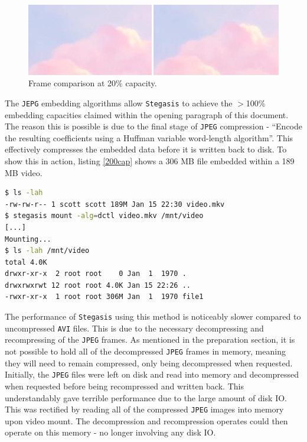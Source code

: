 \documentclass[paper=a4, fontsize=11pt,twoside]{scrartcl}
\numberwithin{table}{section}
\numberwithin{figure}{section}
\numberwithin{algorithm}{section}
\begin{document}
\begin{figure}[!h]
\centerline{\includegraphics[width=\textwidth]{images/bb_20cap.png}}
\caption{Frame comparison at 20\% capacity.}
\label{jpegnoart}
\end{figure}

\noindent
The \texttt{JEPG} embedding algorithms allow \texttt{Stegasis} to achieve the $>$100\% embedding capacities claimed within the opening paragraph of this document. The reason this is possible is due to the final stage of \texttt{JPEG} compression - ``Encode the resulting coefficients using a Huffman variable word-length algorithm''. This effectively compresses the embedded data before it is written back to disk. To show this in action, listing \ref{200cap} shows a 306 MB file embedded within a 189 MB video.

\begin{lstlisting}[language=bash,caption={Demonstration of 162\% embedding capacity.}, frame=single, label=200cap]
$ ls -lah
-rw-rw-r-- 1 scott scott 189M Jan 15 22:30 video.mkv
$ stegasis mount -alg=dctl video.mkv /mnt/video
[...]
Mounting...
$ ls -lah /mnt/video
total 4.0K
drwxr-xr-x  2 root root    0 Jan  1  1970 .
drwxrwxrwt 12 root root 4.0K Jan 15 22:26 ..
-rwxr-xr-x  1 root root 306M Jan  1  1970 file1
\end{lstlisting}

The performance of \texttt{Stegasis} using this method is noticeably slower compared to uncompressed \texttt{AVI} files. This is due to the necessary decompressing and recompressing of the \texttt{JPEG} frames. As mentioned in the preparation section, it is not possible to hold all of the decompressed \texttt{JPEG} frames in memory, meaning they will need to remain compressed, only being decompressed when requested. Initially, the \texttt{JPEG} files were left on disk and read into memory and decompressed when requested before being recompressed and written back. This understandably gave terrible performance due to the large amount of disk IO. This was rectified by reading all of the compressed \texttt{JPEG} images into memory upon video mount. The decompression and recompression operates could then operate on this memory - no longer involving any disk IO.\\
\end{document}
